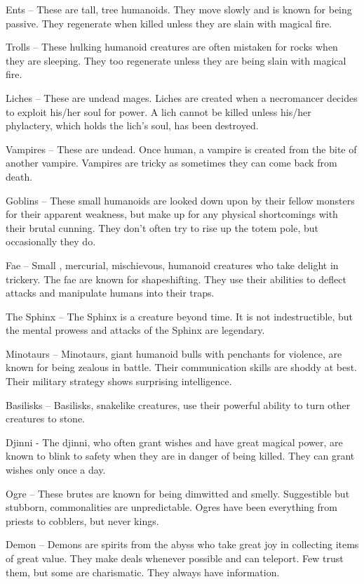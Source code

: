 \documentclass[blue]{guildcamp2}
\begin{document}
Ents -- These are tall, tree humanoids. They move slowly and is known for being passive. They regenerate when killed unless they are slain with magical fire.

Trolls -- These hulking humanoid creatures are often mistaken for rocks when they are sleeping. They too regenerate unless they are being slain with magical fire.

Liches -- These are undead mages. Liches are created when a necromancer decides to exploit his/her soul for power. A lich cannot be killed unless his/her phylactery, which holds the lich's soul, has been destroyed.

Vampires -- These are undead. Once human, a vampire is created from the bite of another vampire. Vampires are tricky as sometimes they can come back from death.

Goblins -- These small humanoids are looked down upon by their fellow monsters for their apparent weakness, but make up for any physical shortcomings with their brutal cunning. They don't often try to rise up the totem pole, but occasionally they do.

Fae -- Small , mercurial, mischievous, humanoid creatures who take delight in trickery. The fae are known for shapeshifting. They use their abilities to deflect attacks and manipulate humans into their traps.

The Sphinx -- The Sphinx is a creature beyond time. It is not indestructible, but the mental prowess and attacks of the Sphinx are legendary. 

Minotaurs -- Minotaurs, giant humanoid bulls with penchants for violence, are known for being zealous in battle. Their communication skills are shoddy at best. Their military strategy shows surprising intelligence.

Basilisks -- Basilisks, snakelike creatures, use their powerful ability to turn other creatures to stone.

Djinni - The djinni, who often grant wishes and have great magical power, are known to blink to safety when they are in danger of being killed. They can grant wishes only once a day.

Ogre -- These brutes are known for being dimwitted and smelly. Suggestible but stubborn, commonalities are unpredictable. Ogres have been everything from priests to cobblers, but never kings.

Demon -- Demons are spirits from the abyss who take great joy in collecting items of great value. They make deals whenever possible and can teleport. Few trust them, but some are charismatic. They always have information.
\end{document}
